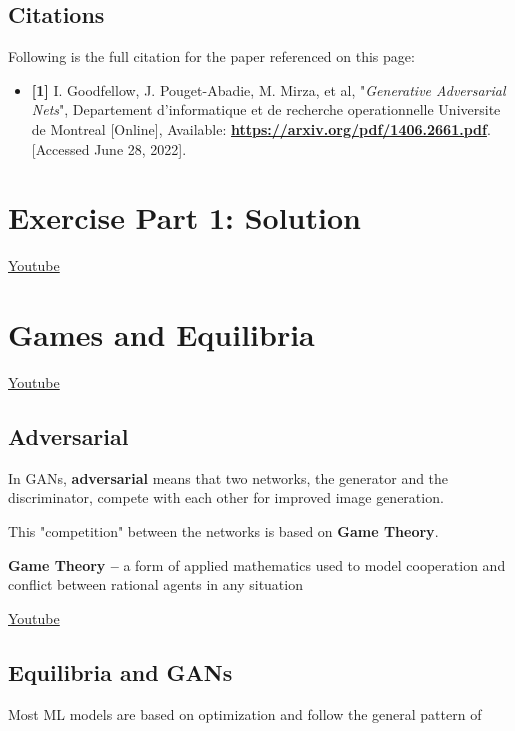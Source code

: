 \subsection{Citations}
Following is the full citation for the paper referenced on this page:

\begin{itemize}
    \item \textbf{[1]} I. Goodfellow, J. Pouget-Abadie, M. Mirza, et al, "\textit{Generative Adversarial Nets}", Departement d’informatique et de recherche operationnelle Universite de Montreal [Online], Available: \href{https://arxiv.org/pdf/1406.2661.pdf}{\textbf{https://arxiv.org/pdf/1406.2661.pdf}}. [Accessed June 28, 2022].
\end{itemize}


\section{Exercise Part 1: Solution}
\href{https://www.youtube.com/watch?v=Wat3QCqs6Is}{Youtube}

\section{Games and Equilibria}
\href{https://www.youtube.com/watch?v=Vpzm8r8C2CY}{Youtube}

\subsection{Adversarial}

In GANs, \textbf{adversarial} means that two networks, the generator and the discriminator, compete with each other for improved image generation. \newline

This "competition" between the networks is based on \textbf{Game Theory}. \newline

\textbf{Game Theory –} a form of applied mathematics used to model cooperation and conflict between rational agents in any situation \newline

\href{https://www.youtube.com/watch?v=O0J6kzhjf4M}{Youtube}
\subsection{Equilibria and GANs}

Most ML models are based on optimization and follow the general pattern of

